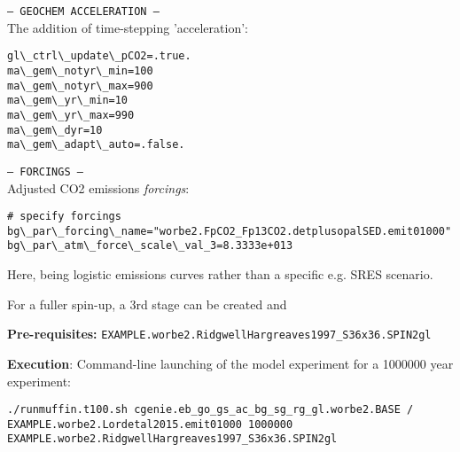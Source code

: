 \documentclass[10pt,twoside]{article}
\begin{document}
\begin{compactitem}

\item \texttt{--- GEOCHEM ACCELERATION ---}
\\ The addition of time-stepping 'acceleration':
\vspace{-5pt}\begin{verbatim}
gl\_ctrl\_update\_pCO2=.true.
ma\_gem\_notyr\_min=100
ma\_gem\_notyr\_max=900
ma\_gem\_yr\_min=10
ma\_gem\_yr\_max=990
ma\_gem\_dyr=10
ma\_gem\_adapt\_auto=.false.
\end{verbatim}\vspace{-5pt}

\item \texttt{--- FORCINGS ---}
\\ Adjusted CO2 emissions \textit{forcings}:
\vspace{-5pt}\begin{verbatim}
# specify forcings
bg\_par\_forcing\_name="worbe2.FpCO2_Fp13CO2.detplusopalSED.emit01000"
bg\_par\_atm\_force\_scale\_val_3=8.3333e+013
\end{verbatim}\vspace{-5pt}
Here, being logistic emissions curves rather than a specific e.g. SRES scenario.

\end{compactitem}

For a fuller spin-up, a 3rd stage can be created and 

\noindent \textbf{Pre-requisites:} \texttt{EXAMPLE.worbe2.RidgwellHargreaves1997\_S36x36.SPIN2gl}

\noindent \textbf{Execution}: Command-line launching of the model experiment for a 1000000 year experiment:
\vspace{-10pt}\small\begin{verbatim}
./runmuffin.t100.sh cgenie.eb_go_gs_ac_bg_sg_rg_gl.worbe2.BASE / 
EXAMPLE.worbe2.Lordetal2015.emit01000 1000000 
EXAMPLE.worbe2.RidgwellHargreaves1997_S36x36.SPIN2gl
\end{verbatim}\normalsize\vspace{-10pt}
\end{document}
